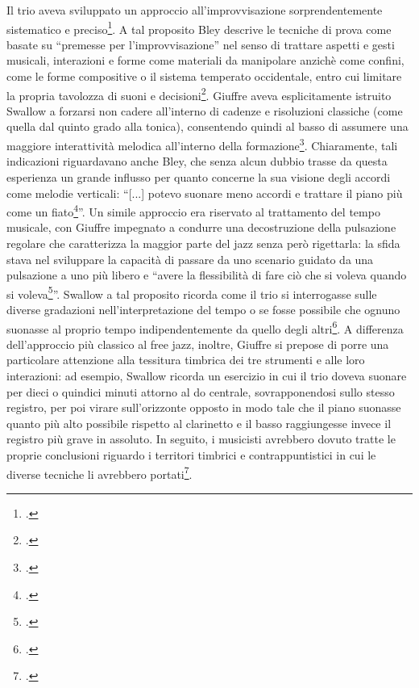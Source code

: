  Il trio aveva sviluppato un approccio all'improvvisazione sorprendentemente sistematico e preciso\footcite[387]{johnston}. A tal proposito Bley descrive le tecniche di prova come basate su ``premesse per l'improvvisazione'' nel senso di trattare aspetti e gesti musicali, interazioni e forme come materiali da manipolare anzichè come confini, come le forme compositive o il sistema temperato occidentale, entro cui limitare la propria tavolozza di suoni e decisioni\footcite[389]{johnston}. Giuffre aveva esplicitamente istruito Swallow a forzarsi non cadere all'interno di cadenze e risoluzioni classiche (come quella dal quinto grado alla tonica), consentendo quindi al basso di assumere una maggiore interattività melodica all'interno della formazione\footcite[390]{johnston}. Chiaramente, tali indicazioni riguardavano anche Bley, che senza alcun dubbio trasse da questa esperienza un grande influsso per quanto concerne la sua visione degli accordi come melodie verticali: ``[...] potevo suonare meno accordi e trattare il piano più come un fiato\footcite[390]{johnston}''. Un simile approccio era riservato al trattamento del tempo musicale, con Giuffre impegnato a condurre una decostruzione della pulsazione regolare che caratterizza la maggior parte del jazz senza però rigettarla: la sfida stava nel sviluppare la capacità di passare da uno scenario guidato da una pulsazione a uno più libero e ``avere la flessibilità di fare ciò che si voleva quando si voleva\footcite[390]{johnston}''. Swallow a tal proposito ricorda come il trio si interrogasse sulle diverse gradazioni nell'interpretazione del tempo o se fosse possibile che ognuno suonasse al proprio tempo indipendentemente da quello degli altri\footcite[390]{johnston}. A differenza dell'approccio più classico al free jazz, inoltre, Giuffre si prepose di porre una particolare attenzione alla tessitura timbrica dei tre strumenti e alle loro interazioni: ad esempio, Swallow ricorda un esercizio in cui il trio doveva suonare per dieci o quindici minuti attorno al do centrale, sovrapponendosi sullo stesso registro, per poi virare sull'orizzonte opposto in modo tale che il piano suonasse quanto più alto possibile rispetto al clarinetto e il basso raggiungesse invece il registro più grave in assoluto. In seguito, i musicisti avrebbero dovuto tratte le proprie conclusioni riguardo i territori timbrici e contrappuntistici in cui le diverse tecniche li avrebbero portati\footcite[391]{johnston}. \par
